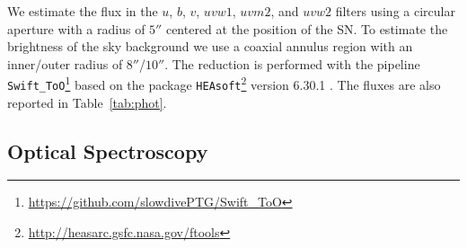 \documentclass[twocolumn]{aastex631}
\begin{document}
\begin{CJK*}{UTF8}{gbsn}
We estimate the flux in the $u$, $b$, $v$, $uvw1$, $uvm2$, and $uvw2$ filters using a circular aperture with a radius of $5''$ centered at the position of the SN. To estimate the brightness of the sky background we use a coaxial annulus region with an inner/outer radius of $8''$/$10''$. The reduction is performed with the pipeline \texttt{Swift\_ToO}\footnote{\url{https://github.com/slowdivePTG/Swift\_ToO}} based on the package \texttt{HEAsoft}\footnote{\url{http://heasarc.gsfc.nasa.gov/ftools}} version 6.30.1 \citep{HEAsoft_2014}. The fluxes are also reported in Table~\ref{tab:phot}.



\subsection{Optical Spectroscopy}\label{sec:optical_spec}


\end{CJK*}
\end{document}
